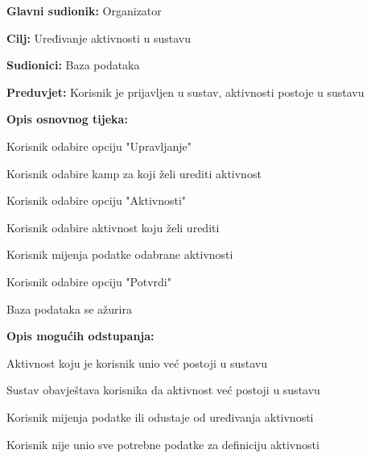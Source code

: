 					\noindent {}
					\begin{packed_item}
						
						\item \textbf{Glavni sudionik: }Organizator
						\item  \textbf{Cilj:} Uređivanje aktivnosti u sustavu
						\item  \textbf{Sudionici:} Baza podataka
						\item  \textbf{Preduvjet:} Korisnik je prijavljen u sustav, aktivnosti postoje u sustavu
						\item  \textbf{Opis osnovnog tijeka:}
						
						\item[] \begin{packed_enum}
							
							
							\item Korisnik odabire opciju "Upravljanje"
							\item Korisnik odabire kamp za koji želi urediti aktivnost
							\item Korisnik odabire opciju "Aktivnosti"
							\item Korisnik odabire aktivnost koju želi urediti
							\item Korisnik mijenja podatke odabrane aktivnosti
							\item Korisnik odabire opciju "Potvrdi"
							\item Baza podataka se ažurira
						\end{packed_enum}
						
						\item  \textbf{Opis mogućih odstupanja:}
						
						\item[] \begin{packed_item}
							
							\item[2.a] Aktivnost koju je korisnik unio već postoji u sustavu
							\item[] \begin{packed_enum}
								
								\item Sustav obavještava korisnika da aktivnost već postoji u sustavu
								\item Korisnik mijenja podatke ili odustaje od uređivanja aktivnosti 
								
							\end{packed_enum}
							\item[2.b] Korisnik nije unio sve potrebne podatke za definiciju aktivnosti
							\item[] \begin{packed_enum}
								

\end{packed_enum}
\end{packed_item}
\end{packed_item}

